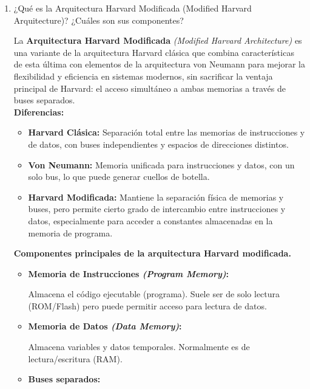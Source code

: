 \documentclass[12pt,letterpaper]{article}
\begin{document}
\begin{enumerate}
\item ¿Qué es la Arquitectura Harvard Modificada (Modified Harvard Arquitecture)? ¿Cuáles son sus componentes?

  La \textbf{Arquitectura Harvard Modificada} \textit{(Modified Harvard Architecture)} es una variante de la arquitectura Harvard clásica que combina características de esta última con elementos de la arquitectura von Neumann para mejorar la flexibilidad y eficiencia en sistemas modernos, sin sacrificar la ventaja principal de Harvard: el acceso simultáneo a ambas memorias a través de buses separados.\\
  
  \textbf{Diferencias:}
  
  \begin{itemize}
  \item \textbf{Harvard Clásica:} Separación total entre las memorias de instrucciones y de datos, con buses independientes y espacios de direcciones distintos.

  \item \textbf{Von Neumann:} Memoria unificada para instrucciones y datos, con un solo bus, lo que puede generar cuellos de botella.

  \item \textbf{Harvard Modificada:} Mantiene la separación física de memorias y buses, pero permite cierto grado de intercambio entre instrucciones y datos, especialmente para acceder a constantes almacenadas en la memoria de programa.
  \end{itemize}
  

  \textbf{Componentes principales de la arquitectura Harvard modificada.}
  
  \begin{itemize}
  \item \textbf{Memoria de Instrucciones \textit{(Program Memory)}:}
    
    Almacena el código ejecutable (programa). Suele ser de solo lectura (ROM/Flash) pero puede permitir acceso para lectura de datos.
    
  \item \textbf{Memoria de Datos \textit{(Data Memory)}:}
    
    Almacena variables y datos temporales. Normalmente es de lectura/escritura (RAM).
    
  \item \textbf{Buses separados:}
    

\end{itemize}
\end{enumerate}
\end{document}
